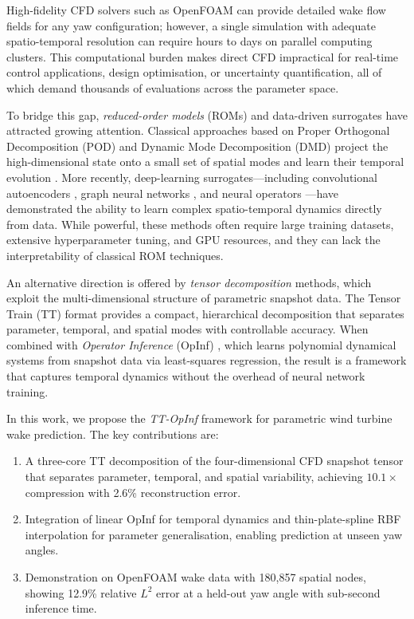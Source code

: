 \documentclass[12pt]{article}
\begin{document}
High-fidelity CFD solvers such as OpenFOAM \citep{OpenFOAM} can provide detailed wake flow fields for any yaw configuration; however, a single simulation with adequate spatio-temporal resolution can require hours to days on parallel computing clusters.
This computational burden makes direct CFD impractical for real-time control applications, design optimisation, or uncertainty quantification, all of which demand thousands of evaluations across the parameter space.

To bridge this gap, \emph{reduced-order models} (ROMs) and data-driven surrogates have attracted growing attention.
Classical approaches based on Proper Orthogonal Decomposition (POD) and Dynamic Mode Decomposition (DMD) project the high-dimensional state onto a small set of spatial modes and learn their temporal evolution \citep{Brunton2019,Benner2015}.
More recently, deep-learning surrogates---including convolutional autoencoders \citep{Tabib2024}, graph neural networks \citep{Chen2024}, and neural operators \citep{Li2021fourier}---have demonstrated the ability to learn complex spatio-temporal dynamics directly from data.
While powerful, these methods often require large training datasets, extensive hyperparameter tuning, and GPU resources, and they can lack the interpretability of classical ROM techniques.

An alternative direction is offered by \emph{tensor decomposition} methods, which exploit the multi-dimensional structure of parametric snapshot data.
The Tensor Train (TT) format \citep{Oseledets2011} provides a compact, hierarchical decomposition that separates parameter, temporal, and spatial modes with controllable accuracy.
When combined with \emph{Operator Inference} (OpInf) \citep{Peherstorfer2016}, which learns polynomial dynamical systems from snapshot data via least-squares regression, the result is a framework that captures temporal dynamics without the overhead of neural network training.

In this work, we propose the \emph{TT-OpInf} framework for parametric wind turbine wake prediction.
The key contributions are:
\begin{enumerate}
    \item A three-core TT decomposition of the four-dimensional CFD snapshot tensor that separates parameter, temporal, and spatial variability, achieving $10.1\times$ compression with 2.6\% reconstruction error.
    \item Integration of linear OpInf for temporal dynamics and thin-plate-spline RBF interpolation for parameter generalisation, enabling prediction at unseen yaw angles.
    \item Demonstration on OpenFOAM wake data with 180{,}857 spatial nodes, showing 12.9\% relative $L^2$ error at a held-out yaw angle with sub-second inference time.
\end{enumerate}
\end{document}
